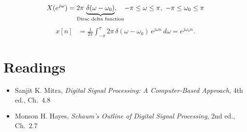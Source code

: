 \documentclass[handout_subfiles_root.tex]{subfiles}
\begin{document}
\begin{equation}
X(e^{j\omega}) = 2\pi\,
\underbrace{\delta(\omega-\omega_0)}_{\HandoutUnderbraceLabel{\text{Dirac delta function}}},
\quad -\pi\le\omega\le\pi,\ -\pi\le\omega_0\le\pi
\end{equation}
\begin{align*}
x[n] &= \frac{1}{2\pi}\int_{-\pi}^{\pi} 2\pi\,\delta(\omega-\omega_0)\,e^{j\omega n}\,d\omega = e^{j\omega_0 n}.
\end{align*}

\section*{Readings}
\begin{itemize}
  \item Sanjit K. Mitra, \textit{Digital Signal Processing: A Computer-Based Approach}, 4th ed., Ch.\ 4.8
  \item Monson H. Hayes, \textit{Schaum's Outline of Digital Signal Processing}, 2nd ed., Ch.\ 2.7
\end{itemize}

\HandoutAppendixListStart
\HandoutAppendixListEnd

\ifhandoutclean\else

\clearpage
\fi

\end{document}
